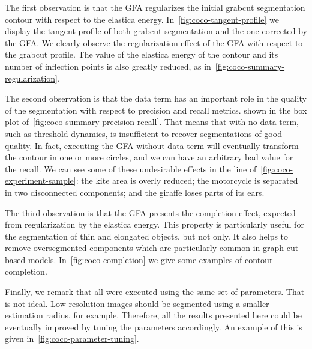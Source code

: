 \documentclass[review]{siamart220329}
\begin{document}
%
%
The first observation is that the GFA regularizes the initial grabcut segmentation contour with respect to the elastica energy. In~\cref{fig:coco-tangent-profile} we display the tangent profile of both grabcut segmentation and the one corrected by the GFA. We clearly observe the regularization effect of the GFA with respect to the grabcut profile. The value of the elastica energy of the contour and its number of inflection points is also greatly reduced, as  in~\cref{fig:coco-summary-regularization}.

The second observation is that the data term has an important role in the quality of the segmentation with respect to precision and recall metrics.  shown in the box plot of~\cref{fig:coco-summary-precision-recall}. That means that  with no data term, such as threshold dynamics, is insufficient to recover segmentations of good quality. In fact, executing the GFA without data term will eventually transform the contour in one or more circles, and we can have an arbitrary bad value for the recall. We can see some of these undesirable effects in the  line of~\cref{fig:coco-experiment-sample}: the kite area is overly reduced; the motorcycle is separated in two disconnected components; and the giraffe loses parts of its ears.

The third observation is that the GFA  presents the completion effect,  expected from regularization by the elastica energy. This property is particularly useful for the segmentation of thin and elongated objects, but not only. It also helps to remove oversegmented components which are particularly common in graph cut based models. In~\cref{fig:coco-completion} we give some examples of contour completion.

Finally, we remark that all  were executed using the same set of parameters. That is not ideal. Low resolution images should be segmented using a smaller estimation radius, for example. Therefore, all the results presented here could be eventually improved by tuning the parameters accordingly. An example of this is given in~\cref{fig:coco-parameter-tuning}.
\end{document}
